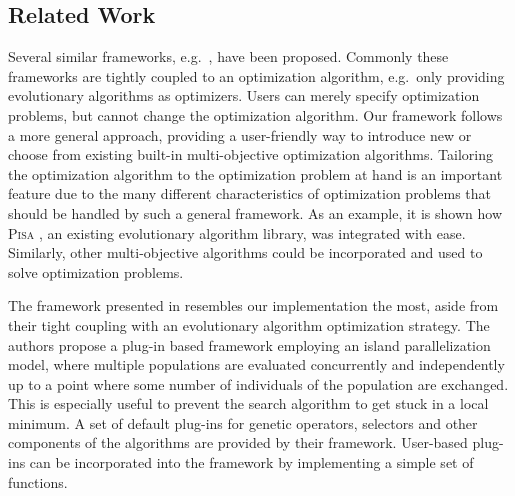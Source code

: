 \documentclass[%
preprint,
preprint,
linenumbers,
amsmath,amssymb,
aps,
prstab,
]{revtex4-1}
\begin{document}
\subsection{Related Work}

Several similar frameworks, e.g.~\cite{fide:09,lems:09,lbjt:07,dnld:06}, have
  been proposed.
Commonly these frameworks are tightly coupled to an optimization algorithm,
  e.g.\ only providing evolutionary algorithms as optimizers.
Users can merely specify optimization problems, but cannot change the
  optimization algorithm.
Our framework follows a more general approach, providing a user-friendly way
  to introduce new or choose from existing built-in multi-objective
  optimization algorithms.
Tailoring the optimization algorithm to the optimization problem at hand is
  an important feature due to the many different characteristics of
  optimization problems that should be handled by such a general framework.
As an example, it is shown how \textsc{Pisa} \cite{pisa}, an existing evolutionary
  algorithm library, was integrated with ease.
Similarly, other multi-objective algorithms could be incorporated and
  used to solve optimization problems.

The framework presented in \cite{lems:09} resembles our implementation the
  most, aside from their tight coupling with an evolutionary algorithm
  optimization strategy.
The authors propose a plug-in based framework employing an island
  parallelization model, where multiple populations are evaluated concurrently
  and independently up to a point where some number of individuals of the
  population are exchanged.
This is especially useful to prevent the search algorithm to get stuck in
  a local minimum.
A set of default plug-ins for genetic operators, selectors and other
  components of the algorithms are provided by their framework.
User-based plug-ins can be incorporated into the framework by implementing a
  simple set of functions.

\end{document}
